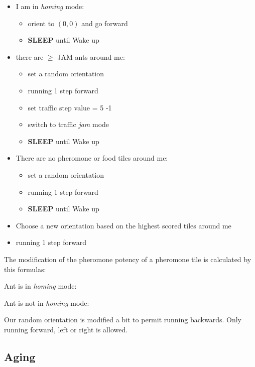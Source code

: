 \begin{itemize}
  \begin{itemize}
  \tightlist
  \item
    I am in \emph{homing} mode:

    \begin{itemize}
    \tightlist
    \item
      orient to \((0,0)\) and go forward
    \item
      \textbf{SLEEP} until Wake up
    \end{itemize}
  \item
    there are \(\geq\) JAM ants around me:

    \begin{itemize}
    \tightlist
    \item
      set a random orientation
    \item
      running 1 step forward
    \item
      set traffic step value = 5 -1
    \item
      switch to traffic \emph{jam} mode
    \item
      \textbf{SLEEP} until Wake up
    \end{itemize}
  \item
    There are no pheromone or food tiles around me:

    \begin{itemize}
    \tightlist
    \item
      set a random orientation
    \item
      running 1 step forward
    \item
      \textbf{SLEEP} until Wake up
    \end{itemize}
  \item
    Choose a new orientation based on the highest scored tiles around me
  \item
    running 1 step forward
  \end{itemize}
\end{itemize}

The modification of the pheromone potency of a pheromone tile is
calculated by this formulas:

Ant is in \emph{homing} mode:

Ant is not in \emph{homing} mode:

Our random orientation is modified a bit to permit running backwards.
Only running forward, left or right is allowed.

\subsection{Aging}\label{aging}

